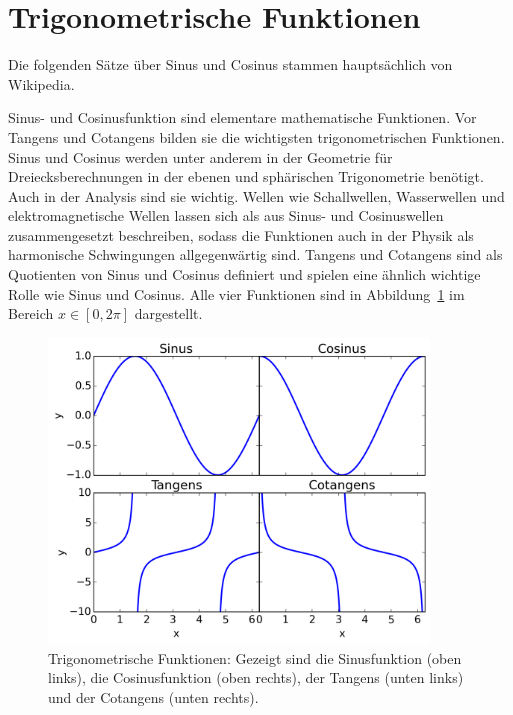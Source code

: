 \documentclass[12pt,a4paper]{scrartcl}
\begin{document}
%
\section{Trigonometrische Funktionen}
Die folgenden Sätze über Sinus und Cosinus stammen hauptsächlich
von Wikipedia.

Sinus- und Cosinusfunktion sind elementare mathematische Funktionen.
Vor Tangens und Cotangens bilden sie die wichtigsten trigonometrischen
Funktionen. Sinus und Cosinus werden unter anderem in der Geometrie
für Dreiecksberechnungen in der ebenen und sphärischen Trigonometrie
benötigt. Auch in der Analysis sind sie wichtig. Wellen wie
Schallwellen, Wasserwellen und elektromagnetische Wellen lassen sich
als aus Sinus- und Cosinuswellen zusammengesetzt beschreiben, sodass
die Funktionen auch in der Physik als harmonische Schwingungen
allgegenwärtig sind. Tangens und Cotangens sind als Quotienten von
Sinus und Cosinus definiert und spielen eine ähnlich wichtige Rolle
wie Sinus und Cosinus. Alle vier Funktionen sind in
Abbildung~\ref{fig:trigo_funk} im Bereich $x\in[0, 2\pi]$ dargestellt.
%
\begin{figure}[ht]
  \centering
  \includegraphics[width=0.9\textwidth]{trigo_funktionen}
  \caption{Trigonometrische Funktionen: Gezeigt sind die Sinusfunktion
    (oben links), die Cosinusfunktion (oben rechts), der Tangens
    (unten links) und der Cotangens (unten rechts).}
  \label{fig:trigo_funk}
\end{figure}
%
\end{document}
